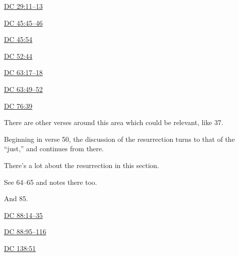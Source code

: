 		\begin{compactdesc}
			\item[{\hyperref[DC29-11]{DC 29:11--13}}] 
			\item[{\hyperref[DC45-45]{DC 45:45--46}}]
			\item[{\hyperref[DC45-54]{DC 45:54}}]
			\item[{\hyperref[DC52-44]{DC 52:44}}]
			\item[{\hyperref[DC63-17]{DC 63:17--18}}]
			\item[{\hyperref[DC63-49]{DC 63:49--52}}]
			\item[{\hyperref[DC76-39]{DC 76:39}}]
				\begin{compactitem}
					\item There are other verses around this area which could be relevant, like 37.
					\item Beginning in verse 50, the discussion of the resurrection turns to that of the ``just,'' and continues from there.
					\item There's a lot about the resurrection in this section.
					\item See 64--65 and notes there too.
					\item And 85.
				\end{compactitem}
			\item[{\hyperref[DC88-14]{DC 88:14--35}}]
			\item[{\hyperref[DC88-95]{DC 88:95--116}}]
			\item[{\hyperref[DC138-51]{DC 138:51}}]
		\end{compactdesc}
		
	
		
		

